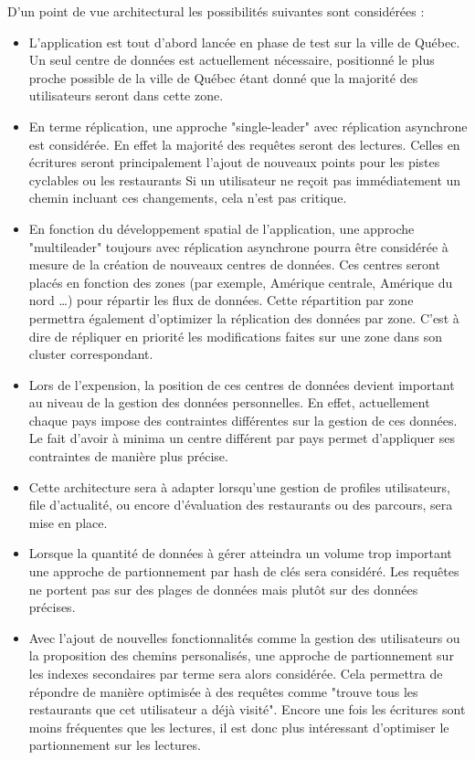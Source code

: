 \documentclass[12pt]{article}
\begin{document}
    D'un point de vue architectural les possibilités suivantes sont considérées :

    \begin{itemize}
        \item L'application est tout d'abord lancée en phase de test sur la ville de Québec. Un seul centre de données est actuellement nécessaire, positionné le plus proche possible de la ville de Québec étant donné que la majorité des utilisateurs seront dans cette zone.
        \item En terme réplication, une approche "single-leader" avec réplication asynchrone est considérée. En effet la majorité des requêtes seront des lectures. Celles en écritures seront principalement l'ajout de nouveaux points pour les pistes cyclables ou les restaurants Si un utilisateur ne reçoit pas immédiatement un chemin incluant ces changements, cela n'est pas critique.
        \item En fonction du développement spatial de l'application, une approche "multileader" toujours avec réplication asynchrone pourra être considérée à mesure de la création de nouveaux centres de données. Ces centres seront placés en fonction des zones (par exemple, Amérique centrale, Amérique du nord \dots) pour répartir les flux de données. Cette répartition par zone permettra également d'optimizer la réplication des données par zone. C'est à dire de répliquer en priorité les modifications faites sur une zone dans son cluster correspondant.
        \item Lors de l'expension, la position de ces centres de données devient important au niveau de la gestion des données personnelles. En effet, actuellement chaque pays impose des contraintes différentes sur la gestion de ces données. Le fait d'avoir à minima un centre différent par pays permet d'appliquer ses contraintes de manière plus précise. 
        \item Cette architecture sera à adapter lorsqu'une gestion de profiles utilisateurs, file d'actualité, ou encore d'évaluation des restaurants ou des parcours, sera mise en place.
        \item Lorsque la quantité de données à gérer atteindra un volume trop important une approche de partionnement par hash de clés sera considéré. Les requêtes ne portent pas sur des plages de données mais plutôt sur des données précises.
        \item Avec l'ajout de nouvelles fonctionnalités comme la gestion des utilisateurs ou la proposition des chemins personalisés, une approche de partionnement sur les indexes secondaires par terme sera alors considérée. Cela permettra de répondre de manière optimisée à des requêtes comme "trouve tous les restaurants que cet utilisateur a déjà visité". Encore une fois les écritures sont moins fréquentes que les lectures, il est donc plus intéressant d'optimiser le partionnement sur les lectures. 
    \end{itemize}
\end{document}
